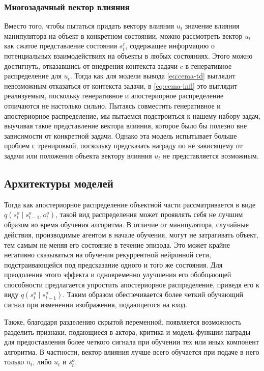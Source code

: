 \subsubsection{Многозадачный вектор влияния}
Вместо того, чтобы пытаться придать вектору влияния $u_t$ значение влияния манипулятора на объект в конкретном состоянии, можно рассмотреть вектор $u_t$ как сжатое представление состояния $s^r_t$, содержащее информацию о потенциальных взаимодействиях на объекты в любых состояниях.
Этого можно достигнуть, отказавшись от внедрения контекста задачи $c$ в генеративное распределение для $u_t$.
Тогда как для модели вывода \ref{eq:cema-td} выглядит невозможным отказаться от контекста задачи, в \ref{eq:cema-infl} это выглядит реализуемым, поскольку генеративное и апостериорное распределение отличаются не настолько сильно.
Пытаясь совместить генеративное и апостериорное распределение, мы пытаемся подстроиться к нашему набору задач, выучивая такое представление вектора влияния, которое было бы полезно вне зависимости от конкретной задачи.
Однако эта модель испытывает больше проблем с тренировкой, поскольку предсказать награду по не зависящему от задачи или положения объекта вектору влияния $u_t$ не представляется возможным.

\subsection{Архитектуры моделей}
Тогда как апостериорное распределение объектной части рассматривается в виде $q(s^o_t \mid s^o_{t-1}, o^o_t)$, такой вид распределения может проявлять себя не лучшим образом во время обучения алгоритма.
В отличие от манипулятора, случайные действия, производимые агентом в начале обучения, могут не затрагивать объект, тем самым не меняя его состояние в течение эпизода.
Это может крайне негативно сказываться на обучении рекуррентной нейронной сети, подстраивающейся под предсказание одного и того же состояния.
Для преодоления этого эффекта и одновременно улучшения его обобщающей способности предлагается упростить апостериорное распределение, приведя его к виду $q(s^o_t \mid s^o_{t-1})$.
Таким образом обеспечивается более четкий обучающий сигнал при изменении изображения, подающегося на вход.

Также, благодаря разделению скрытой переменной, появляется возможность разделить признаки, подающиеся в актора, критика и модель функции награды для предоставления более четкого сигнала при обучении тех или иных компонент алгоритма. В частности, вектор влияния лучше всего обучается при подаче в него только $u_t$, либо $u_t$ и $s^o_t$.

